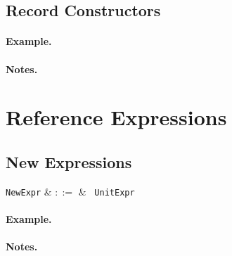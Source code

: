 \subsection{Record Constructors}
\label{c_expr_record_constructor}

\begin{syntax}
\end{syntax}

\paragraph{Example.}

\paragraph{Notes.}

\section{Reference Expressions}


\subsection{New Expressions}
\label{c_expr_new}

\begin{syntax}
\verb+NewExpr+ & $::=$ & \ \verb+UnitExpr+\\
\end{syntax}

\paragraph{Example.}

\paragraph{Notes.}


